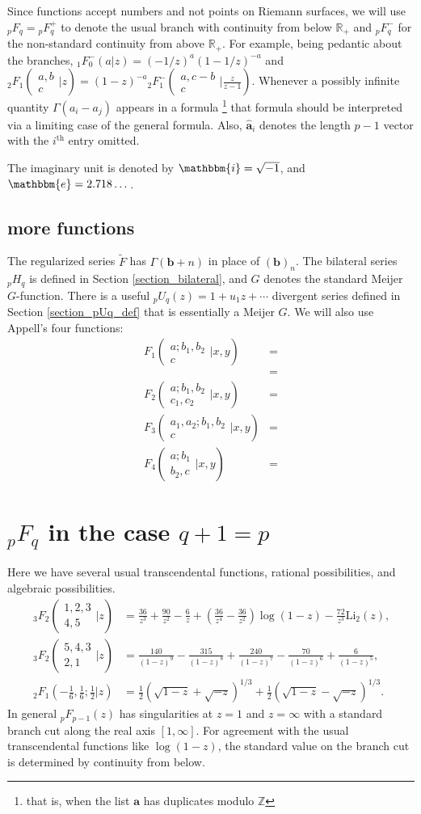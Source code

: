 \documentclass[12pt]{article}
\newcommand{\ee}[0] {\mathbbm{e}}
\newcommand{\ii}[0] {\mathbbm{i}}
\numberwithin{equation}{section}
\newcommand{\Head}[3] {{}_{#1}{#2}_{#3}}
\newcommand{\ArgS}[3] {( \begin{smallmatrix} #1 \\ #2 \end{smallmatrix} | {#3})}
\newcommand{\appellFoneS}[6] {F_1 \ArgS{{#1};{#2},{#3}}{#4}{{#5},{#6}}}
\newcommand{\appellFtwoS}[7] {F_2 \ArgS{{#1};{#2},{#3}}{{#4},{#5}}{{#6},{#7}}}
\newcommand{\appellFthreeS}[7] {F_3 \ArgS{{#1},{#2};{#3},{#4}}{{#5}}{{#6},{#7}}}
\newcommand{\appellFfourS}[6]    {F_4 \ArgS{{#1};{#2}}{{#3},{#4}}{{#5},{#6}}}
\newcommand{\FF}[6] {{}_{#1}{#2}_{#3} \left( \begin{array}{c} #4 \\ #5 \end{array} \Big| {#6}  \right)}
\newcommand{\FFs}[6] {{}_{#1}{#2}_{#3} ( \begin{smallmatrix} #4 \\ #5 \end{smallmatrix} | {#6}  )}
\newcommand{\FFes}[7] {{}_{#1}^{\,}{#2}_{#3}^{#4} ( \begin{smallmatrix} #5 \\ #6 \end{smallmatrix} | {#7} )}
\newcommand{\FFf}[5] {{}_{#1}{#2}_{#3} \left(#4 | {#5} \right)}
\newcommand{\bfa}[0] {\mathbf{a}}
\newcommand{\bfb}[0] {\mathbf{b}}
\begin{document}
Since functions accept numbers and not points on Riemann surfaces, we will use ${}_p F_{q} = {}_p F_{q}^{+}$ to denote the usual branch with continuity from below $\mathbb{R}_{+}$ and ${}_p^{\,} F_{q}^{-}$ for the non-standard continuity from above $\mathbb{R}_{+}$. For example, being pedantic about the branches, $\Head{1}{F}{0}^{-}(a|z) = (-1/z)^a (1-1/z)^{-a}$ and $\FFs{2}{F}{1}{a,b}{c}{z} = (1-z)^{-a} \FFes{2}{F}{1}{-}{a,c-b}{c}{\tfrac{z}{z-1}}$. Whenever a possibly infinite quantity $\Gamma(a_i-a_j)$ appears in a formula \footnote{that is, when the list $\bfa$ has duplicates modulo $\mathbb{Z}$} that formula should be interpreted via a limiting case of the general formula. Also, $\hat{\mathbf{a}}_i$ denotes the length $p-1$ vector with the $i^{\text{th}}$ entry omitted.

The imaginary unit is denoted by $\ii = \sqrt{-1}$, and $\ee = 2.718\dots$.

\subsection{more functions}
The regularized series $\tilde{F}$ has $\Gamma(\bfb+n)$ in place of $(\bfb)_n$. The bilateral series $\Head{p}{H}{q}$ is defined in Section \ref{section_bilateral}, and $G$ denotes the standard Meijer $G$-function. There is a useful $\Head{p}{U}{q}(z) = 1 + u_1 z + \cdots$ divergent series defined in Section \ref{section_pUq_def} that is essentially a Meijer $G$. We will also use Appell's four functions:
\begin{align*}
\appellFoneS{a}{b_1}{b_2}{c}{x}{y} &=\\
&=\\
\appellFtwoS{a}{b_1}{b_2}{c_1}{c_2}{x}{y}  &=\\
\appellFthreeS{a_1}{a_2}{b_1}{b_2}{c}{x}{y}  &=\\
\appellFfourS{a}{b_1}{b_2}{c}{x}{y}  &=
\end{align*}

\section{$\Head{p}{F}{q}$ in the case $q+1=p$}
Here we have several usual transcendental functions, rational possibilities, and algebraic possibilities.
\begin{align*}
\FF{3}{F}{2}{1,2,3}{4,5}{z} &= \frac{36}{z^3}+\frac{90}{z^2}-\frac{6}{z}+\left
   (\frac{36}{z^4}-\frac{36}{z^2}\right) \log
   (1-z)-\frac{72}{z^3}
   \text{Li}_2(z)\text{,}\\
\FF{3}{F}{2}{5,4,3}{2,1}{z} &= \frac{140}{(1-z)^9}-\frac{315}{(1-z)^8}+\frac{240}{(1-z)^7}-\frac{70}{(1-z)^6}+\frac{6}{(1-z)^5}\text{,}\\
\FFf{2}{F}{1}{-\tfrac{1}{6}, \tfrac{1}{6};\tfrac{1}{2}}{z} &= \tfrac{1}{2} \left(\sqrt{1-z}+\sqrt{-z}\right)^{1/3}+\tfrac{1}{2} \left(\sqrt{1-z}-\sqrt{-z}\right)^{1/3}\text{.}
\end{align*}
In general ${}_{p}F_{p-1}(z)$ has singularities at $z=1$ and $z=\infty$ with a standard branch cut along the real axis $[1,\infty]$. For agreement with the usual transcendental functions like $\log(1-z)$, the standard value on the branch cut is determined by continuity from below.
\end{document}
